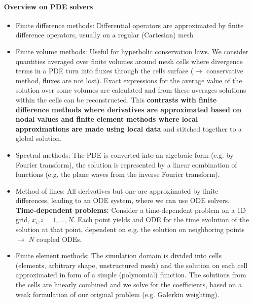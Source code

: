 \paragraph*{Overview on PDE solvers}
\begin{itemize}
    \item \textcolor{blue1}{Finite difference methods:} Differential operators are approximated by finite difference operators, usually on a regular (Cartesian) mesh
    \item \textcolor{blue1}{Finite volume methods:} Useful for hyperbolic conservation 
    laws. We consider quantities averaged over finite volumes around mesh cells where 
    divergence terms in a PDE turn into fluxes through the cells surface ($\rightarrow$ conservative 
    method, fluxes are not lost). Exact expressions for the average value of the solution over some volumes 
    are calculated and from these averages solutions within the cells can be reconstructed. This \textbf{contrasts with 
    finite difference methods where derivatives are approximated based on nodal values and finite element 
    methods where local approximations are made using local data} and stitched together to a global solution.
    \item \textcolor{blue1}{Spectral methods:} The PDE is converted into an algebraic form (e.g. by Fourier transform), the solution is represented by a linear combination of functions (e.g. the plane waves from the inverse Fourier transform).
    \item \textcolor{blue1}{Method of lines:} All derivatives but one are approximated by finite differences, leading to an ODE system, where we can use ODE solvers. \textbf{Time-dependent problems:} Consider a time-dependent problem on a 1D grid, $x_i, i=1,...,N$. Each point yields and ODE for the time evolution of the solution at that point, dependent on e.g. the solution on neighboring points $\rightarrow$ $N$ coupled ODEs.
    \item \textcolor{blue1}{Finite element methods:} The simulation domain is divided into cells (elements, arbitrary shape, unstructured mesh) and the solution on each cell approximated in form of a simple (polynomial) function. The solutions from the cells are linearly combined and we solve for the coefficients, based on a weak
    formulation of our original problem (e.g. Galerkin weighting).
\end{itemize}


